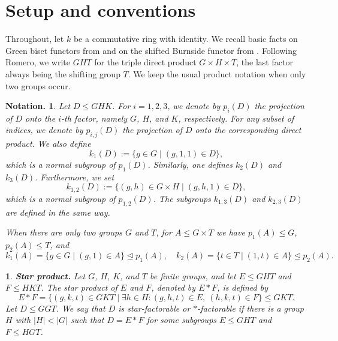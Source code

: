 \documentclass[12pt]{article}
\theoremstyle{change}
\newtheorem{notation}[theorem]{Notation.}
\newtheorem{nothing}[theorem]{}
\renewcommand{\le}{\leqslant} %
\newcommand{\calS}{\mathcal{S}}
\newcommand{\1}{{\bf 1}}
\begin{document}
\section{Setup and conventions}



Throughout, let $k$ be a commutative ring with identity. We recall basic facts on Green biset functors from \cite{B} and on the shifted Burnside functor from \cite{R1}. Following Romero, we write $GHT$ for the triple direct product $G\times H\times T$, the last factor always being the shifting group $T$. We keep the usual product notation when only two groups occur. 

\begin{notation}
Let $D \leq GHK$. For $i = 1,2,3$, we denote by $p_i(D)$ the projection of $D$ onto the $i$-th factor, namely $G$, $H$, and $K$, respectively. For any subset of indices, we denote by $p_{i,j}(D)$ the projection of $D$ onto the corresponding direct product. We also define
\[
k_1(D) := \{ g \in G \mid (g,1,1) \in D \},
\]
which is a normal subgroup of $p_1(D)$. Similarly, one defines $k_2(D)$ and $k_3(D)$.
Furthermore, we set
\[
k_{1,2}(D) := \{ (g,h) \in G \times H \mid (g,h,1) \in D \},
\]
which is a normal subgroup of $p_{1,2}(D)$. The subgroups $k_{1,3}(D)$ and $k_{2,3}(D)$ are defined in the same way.

When there are only two groups $G$ and $T$, for $A\le G\times T$ we have $p_1(A)\le G$, $p_2(A)\le T$, and
\[
k_1(A)=\{g\in G\mid (g,1)\in A\}\trianglelefteq p_1(A),\quad
k_2(A)=\{t\in T\mid (1,t)\in A\}\trianglelefteq p_2(A).
\]
\end{notation}
\begin{nothing}
\textbf{Star product.}
Let $G$, $H$, $K$, and $T$ be finite groups, and let $E \leq GHT$ and $F \leq HKT$. The \emph{star product} of $E$ and $F$, denoted by $E * F$, is defined by
\[
E * F = \{ (g,k,t) \in GKT \mid \exists h \in H : (g,h,t) \in E,\ (h,k,t) \in F \}\le GKT.
\]
Let $D\le GGT$. We say that $D$ is \emph{star-factorable or $\ast$-factorable} if there is a group $H$ with $|H| < |G|$ such that $D = E \ast F$ for some subgroups $E\le GHT$ and $F\le HGT$.   
\end{nothing}
\end{document}
